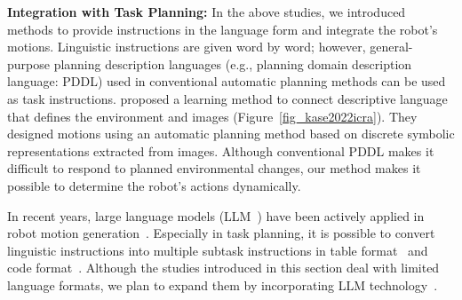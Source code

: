 \textbf{Integration with Task Planning:}
In the above studies, we introduced methods to provide instructions in the language form and integrate the robot's motions. Linguistic instructions are given word by word; however, general-purpose planning description languages (e.g., planning domain description language: PDDL) used in conventional automatic planning methods can be used as task instructions. \cite{Kase2020icra} proposed a learning method to connect descriptive language that defines the environment and images (Figure~\ref{fig_kase2022icra}). They designed motions using an automatic planning method based on discrete symbolic representations extracted from images. Although conventional PDDL makes it difficult to respond to planned environmental changes, our method makes it possible to determine the robot's actions dynamically.


In recent years, large language models (LLM~\cite{Zhao2023}) have been actively applied in robot motion generation~\cite{Shridhar2021a,Liang2022a,Brohan2022a,Driess2023a}. Especially in task planning, it is possible to convert linguistic instructions into multiple subtask instructions in table format~\cite{Ahn2022,huang2022language} and code format~\cite{Vemprala2023,codeaspolicies2022}. Although the studies introduced in this section deal with limited language formats, we plan to expand them by incorporating LLM technology~\cite{Hori2024}.


